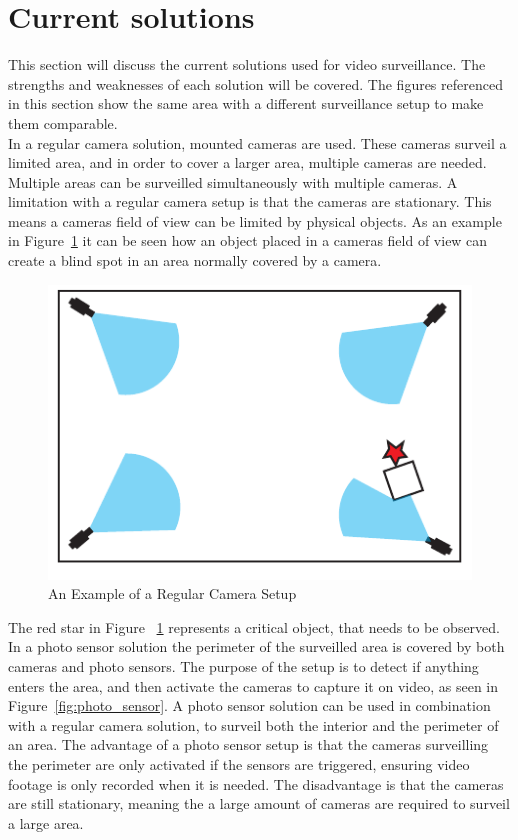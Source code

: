 \section{Current solutions}
This section will discuss the current solutions used for video surveillance.
The strengths and weaknesses of each solution will be covered.
The figures referenced in this section show the same area with a different surveillance setup to make them comparable. \\

In a regular camera solution, mounted cameras are used.
These cameras surveil a limited area, and in order to cover a larger area, multiple cameras are needed.
Multiple areas can be surveilled simultaneously with multiple cameras.
A limitation with a regular camera setup is that the cameras are stationary.
This means a cameras field of view can be limited by physical objects.
As an example in Figure~\ref{fig:refular_camera_setup} it can be seen how an object placed in a cameras field of view can create a blind spot in an area normally covered by a camera. \\

\begin{figure}[htb]
    \centering
    \includegraphics[width=\textwidth]{gfx/regular_camera_setup.pdf}
    \caption{An Example of a Regular Camera Setup}
    \label{fig:refular_camera_setup}
\end{figure}

The red star in Figure ~\ref{fig:refular_camera_setup} represents a critical object, that needs to be observed. \\

In a photo sensor solution the perimeter of the surveilled area is covered by both cameras and photo sensors.
The purpose of the setup is to detect if anything enters the area, and then activate the cameras to capture it on video, as seen in Figure~\ref{fig:photo_sensor}.
A photo sensor solution can be used in combination with a regular camera solution, to surveil both the interior and the perimeter of an area.
The advantage of a photo sensor setup is that the cameras surveilling the perimeter are only activated if the sensors are triggered, ensuring video footage is only recorded when it is needed.
The disadvantage is that the cameras are still stationary, meaning the a large amount of cameras are required to surveil a large area. \\


